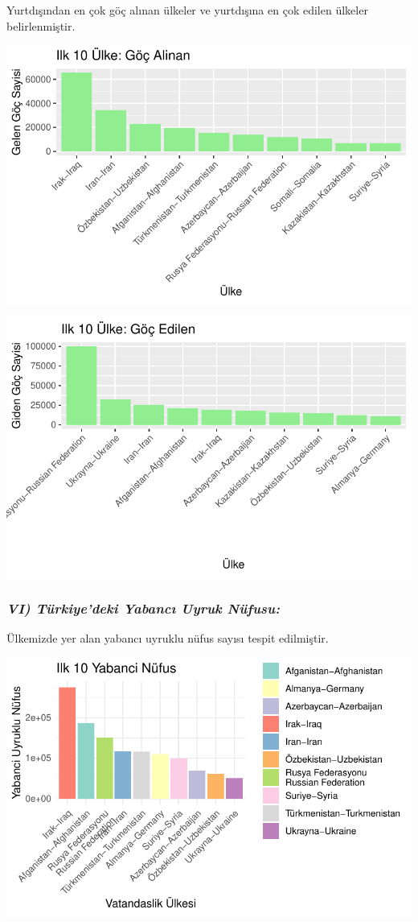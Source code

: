 \documentclass[
  11pt,
  a4paper,
  DIV=11,
  numbers=noendperiod]{scrartcl}
\begin{document}
Yurtdışından en çok göç alınan ülkeler ve yurtdışına en çok edilen
ülkeler belirlenmiştir.

\includegraphics{project_files/figure-pdf/unnamed-chunk-7-1.pdf}

\includegraphics{project_files/figure-pdf/unnamed-chunk-7-2.pdf}

\subsubsection{\texorpdfstring{\emph{VI) Türkiye'deki Yabancı Uyruk
Nüfusu:}}{VI) Türkiye'deki Yabancı Uyruk Nüfusu:}}\label{vi-tuxfcrkiyedeki-yabancux131-uyruk-nuxfcfusu}

Ülkemizde yer alan yabancı uyruklu nüfus sayısı tespit edilmiştir.

\includegraphics{project_files/figure-pdf/unnamed-chunk-8-1.pdf}
\end{document}
